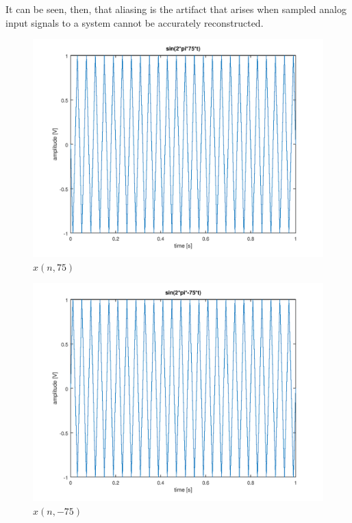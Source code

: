 \documentclass[a4paper, 12pt]{report}
\begin{document}
			It can be seen, then, that aliasing is the artifact that arises when sampled analog input signals to a system cannot be accurately reconstructed.

			\begin{figure}[H]
				\label{fig:16}
				\includegraphics[width=\textwidth]{img/1_16.png}
				\caption{$x(n, 75)$}
			\end{figure}

			\begin{figure}[H]
				\label{fig:17}
				\includegraphics[width=\textwidth]{img/1_17.png}
				\caption{$x(n, -75)$}
			\end{figure}
\end{document}
